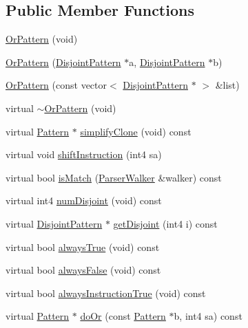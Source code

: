 \subsection*{Public Member Functions}
\begin{DoxyCompactItemize}
\item 
\mbox{\hyperlink{class_or_pattern_adfb8feafd5e28e0699e2279b02f79112}{Or\+Pattern}} (void)
\item 
\mbox{\hyperlink{class_or_pattern_a47acd6bf2f0acc89d62069ef90b41f39}{Or\+Pattern}} (\mbox{\hyperlink{class_disjoint_pattern}{Disjoint\+Pattern}} $\ast$a, \mbox{\hyperlink{class_disjoint_pattern}{Disjoint\+Pattern}} $\ast$b)
\item 
\mbox{\hyperlink{class_or_pattern_a8c14e073b96dbe15750186b3a37a17c2}{Or\+Pattern}} (const vector$<$ \mbox{\hyperlink{class_disjoint_pattern}{Disjoint\+Pattern}} $\ast$ $>$ \&list)
\item 
virtual \mbox{\hyperlink{class_or_pattern_a83f4a4614840c6ebbaf034473b1492eb}{$\sim$\+Or\+Pattern}} (void)
\item 
virtual \mbox{\hyperlink{class_pattern}{Pattern}} $\ast$ \mbox{\hyperlink{class_or_pattern_ae6db76f35f6dc8661a511c9db40ecfd7}{simplify\+Clone}} (void) const
\item 
virtual void \mbox{\hyperlink{class_or_pattern_af13615fe47dc6f432201ee4827ff1510}{shift\+Instruction}} (int4 sa)
\item 
virtual bool \mbox{\hyperlink{class_or_pattern_adb47d2014fe8dea89cd155122442c2c2}{is\+Match}} (\mbox{\hyperlink{class_parser_walker}{Parser\+Walker}} \&walker) const
\item 
virtual int4 \mbox{\hyperlink{class_or_pattern_a7cf494190ca4e0258ac7c52157347f8c}{num\+Disjoint}} (void) const
\item 
virtual \mbox{\hyperlink{class_disjoint_pattern}{Disjoint\+Pattern}} $\ast$ \mbox{\hyperlink{class_or_pattern_a0d788a68161acca8b39f4fd999a7b9d8}{get\+Disjoint}} (int4 i) const
\item 
virtual bool \mbox{\hyperlink{class_or_pattern_a22c4506e990fb885136d8684e01bcde1}{always\+True}} (void) const
\item 
virtual bool \mbox{\hyperlink{class_or_pattern_a8c30dc08477e285537c42e7246ec4d0e}{always\+False}} (void) const
\item 
virtual bool \mbox{\hyperlink{class_or_pattern_af5c30dcc861e051d0c741cf5989f657f}{always\+Instruction\+True}} (void) const
\item 
virtual \mbox{\hyperlink{class_pattern}{Pattern}} $\ast$ \mbox{\hyperlink{class_or_pattern_a969bd58751ab797ec77e4c0c74168410}{do\+Or}} (const \mbox{\hyperlink{class_pattern}{Pattern}} $\ast$b, int4 sa) const

\end{DoxyCompactItemize}
